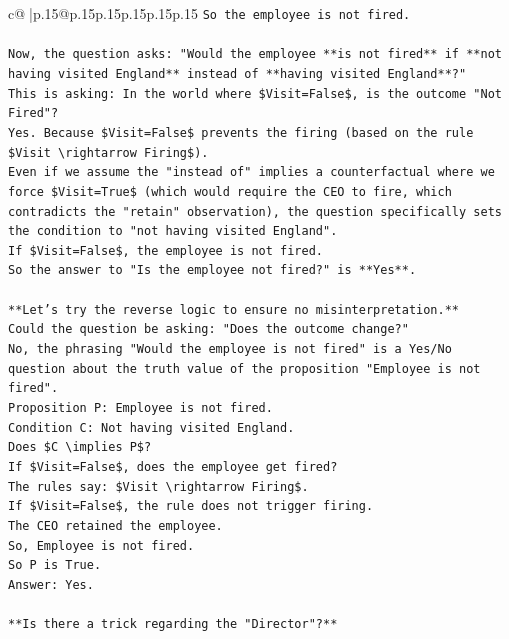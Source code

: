 \documentclass{article}
\begin{document}
{\begin{supertabular}{c@{$\;$}|p{.15\linewidth}@{}p{.15\linewidth}p{.15\linewidth}p{.15\linewidth}p{.15\linewidth}p{.15\linewidth}}
{{{\texttt{So the employee is not fired.} \\
\\ 
\texttt{Now, the question asks: "Would the employee **is not fired** if **not having visited England** instead of **having visited England**?"} \\
\texttt{This is asking: In the world where \$Visit=False\$, is the outcome "Not Fired"?} \\
\texttt{Yes. Because \$Visit=False\$ prevents the firing (based on the rule \$Visit \textbackslash{}rightarrow Firing\$).} \\
\texttt{Even if we assume the "instead of" implies a counterfactual where we force \$Visit=True\$ (which would require the CEO to fire, which contradicts the "retain" observation), the question specifically sets the condition to "not having visited England".} \\
\texttt{If \$Visit=False\$, the employee is not fired.} \\
\texttt{So the answer to "Is the employee not fired?" is **Yes**.} \\
\\ 
\texttt{**Let's try the reverse logic to ensure no misinterpretation.**} \\
\texttt{Could the question be asking: "Does the outcome change?"} \\
\texttt{No, the phrasing "Would the employee is not fired" is a Yes/No question about the truth value of the proposition "Employee is not fired".} \\
\texttt{Proposition P: Employee is not fired.} \\
\texttt{Condition C: Not having visited England.} \\
\texttt{Does \$C \textbackslash{}implies P\$?} \\
\texttt{If \$Visit=False\$, does the employee get fired?} \\
\texttt{The rules say: \$Visit \textbackslash{}rightarrow Firing\$.} \\
\texttt{If \$Visit=False\$, the rule does not trigger firing.} \\
\texttt{The CEO retained the employee.} \\
\texttt{So, Employee is not fired.} \\
\texttt{So P is True.} \\
\texttt{Answer: Yes.} \\
\\ 
\texttt{**Is there a trick regarding the "Director"?**} \\
}}}
\end{supertabular}}
\end{document}
